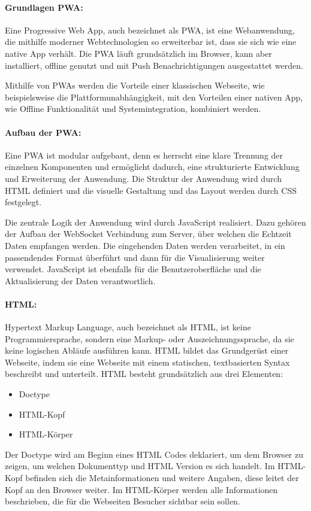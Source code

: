 \paragraph{Grundlagen PWA:}
Eine Progressive Web App, auch bezeichnet als PWA, ist eine Webanwendung, die mithilfe moderner Webtechnologien so erweiterbar ist, dass sie sich wie eine native App verhält. Die PWA läuft grundsätzlich im Browser, kann aber installiert, offline genutzt und mit Push Benachrichtigungen ausgestattet werden. 

\noindent
Mithilfe von PWAs werden die  Vorteile einer klassischen Webseite, wie beispielsweise die Plattformunabhängigkeit, mit den Vorteilen einer nativen App, wie Offline Funktionalität und Systemintegration, 
kombiniert werden. \cite{pechschwarz_pwa}


\paragraph{Aufbau der PWA:}
Eine PWA ist modular aufgebaut, denn es herrscht eine klare Trennung der einzelnen Komponenten und ermöglicht dadurch, eine strukturierte Entwicklung und Erweiterung der Anwendung. Die Struktur der Anwendung wird durch HTML definiert und die visuelle Gestaltung und das Layout werden durch CSS festgelegt.

\noindent
Die zentrale Logik der Anwendung wird durch JavaScript realisiert. Dazu gehören der Aufbau der WebSocket Verbindung zum Server, über welchen die Echtzeit Daten empfangen werden. Die eingehenden Daten werden verarbeitet, in ein passendendes Format überführt und dann für die Visualisierung weiter verwendet. JavaScript ist ebenfalls für die Benutzeroberfläche und die Aktualisierung der Daten verantwortlich.


\paragraph{HTML:}
Hypertext Markup Language, auch bezeichnet als HTML, ist keine Programmiersprache, sondern eine Markup- oder Auszeichnungssprache, da sie keine logischen Abläufe ausführen kann. HTML bildet das Grundgerüst einer Webseite, indem sie eine Webseite mit einem statischen, textbasierten Syntax beschreibt und unterteilt.
\noindent
HTML besteht grundsätzlich aus drei Elementen:
\begin{itemize}
    \item Doctype
    \item HTML-Kopf
    \item HTML-Körper
\end{itemize}	
Der Doctype wird am Beginn eines HTML Codes deklariert, um dem Browser zu zeigen, um welchen Dokumenttyp und HTML Version es sich handelt. Im HTML-Kopf befinden sich die Metainformationen und weitere Angaben, diese leitet der Kopf an den Browser weiter. Im HTML-Körper werden alle Informationen beschrieben, 
die für die Webseiten Besucher sichtbar sein sollen. \cite{ionos_html}

